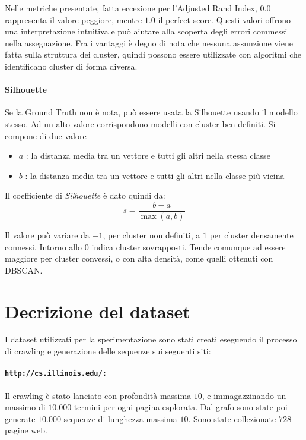 Nelle metriche presentate, fatta eccezione per l'Adjusted Rand Index, $0.0$ rappresenta il valore peggiore, mentre $1.0$ il perfect score. Questi valori offrono una interpretazione intuitiva e può aiutare alla scoperta degli errori commessi nella assegnazione. Fra i vantaggi è degno di nota che nessuna assunzione viene fatta sulla struttura dei cluster, quindi possono essere utilizzate con algoritmi che identificano cluster di forma diversa.

\paragraph{Silhouette}
Se la Ground Truth non è nota, può essere usata la Silhouette usando il modello stesso. Ad un alto valore corrispondono modelli con cluster ben definiti. Si compone di due valore
\begin{itemize}
\item $a$ : la distanza media tra un vettore e tutti gli altri nella stessa classe
\item $b$ : la distanza media tra un vettore e tutti gli altri nella classe più vicina
\end{itemize}

Il coefficiente di \textit{Silhouette} è dato quindi da:
\begin{equation}
s = \frac{b - a}{\max (a,b)}
\end{equation}

Il valore può variare da $-1$, per cluster non definiti, a $1$ per cluster densamente connessi. Intorno allo $0$ indica cluster sovrapposti. Tende comunque ad essere maggiore per cluster convessi, o con alta densità, come quelli ottenuti con DBSCAN.


\section{Decrizione del dataset}
I dataset utilizzati per la sperimentazione sono stati creati eseguendo il processo di crawling e generazione delle sequenze sui seguenti siti:


\paragraph{\texttt{http://cs.illinois.edu/:}}
Il crawling è stato lanciato con profondità massima $10$, e immagazzinando un massimo di $10.000$ termini per ogni pagina esplorata. Dal grafo sono state poi generate $10.000$ sequenze di lunghezza massima $10$. Sono state collezionate $728$ pagine web.


